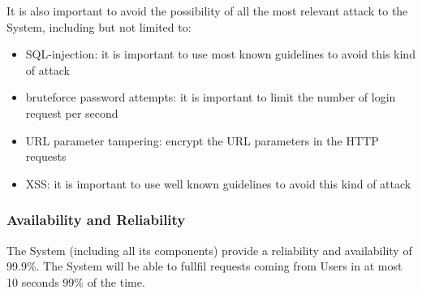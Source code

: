 It is also important to avoid the possibility of all the most relevant attack to the System, including but not limited to:
\begin{itemize}
	\item SQL-injection: it is important to use most known guidelines to avoid this kind of attack
	\item bruteforce password attempts: it is important to limit the number of login request per second
	\item URL parameter tampering: encrypt the URL parameters in the HTTP requests
	\item XSS: it is important to use well known guidelines to avoid this kind of attack
\end{itemize}

\subsubsection{Availability and Reliability}
The System (including all its components) provide a reliability and availability of 99.9\%.
The System will be able to fullfil requests coming from Users in at most 10 seconds 99\% of the time.

